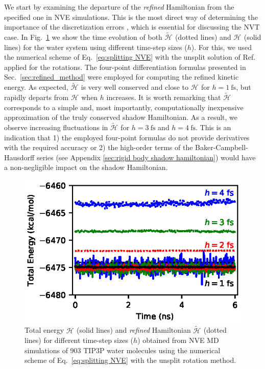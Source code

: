 \documentclass[
journal=jctcce,
layout=twocolumn
]{achemso}
\newcommand{\Ham}[1]{{\mathcal H}_\text{#1}}    %
\newcommand{\timestep}{h}
\newcommand{\refined}[1]{\widetilde{#1}}
\begin{document}
We start by examining the departure of the \textit{refined} Hamiltonian from the specified one in NVE simulations.
This is the most direct way of determining the importance of the discretization errors \cite{Engle_2005}, which is essential for discussing the NVT case.
In Fig.~\ref{fig:nve} we show the time evolution of both $\refined{\Ham{}}$ (dotted lines) and $\Ham{}$ (solid lines) for the water system using different time-step sizes ($\timestep$).
For this, we used the numerical scheme of Eq.~\eqref{eq:splitting NVE} with the unsplit solution of Ref.~ applied for the rotations.
The four-point differentiation formulas presented in Sec.~\ref{sec:refined_method} were employed for computing the refined kinetic energy.
As expected, $\refined{\Ham{}}$ is very well conserved and close to $\Ham{}$ for $\timestep = 1~\text{fs}$, but rapidly departs from $\Ham{}$ when $\timestep$ increases.
It is worth remarking that $\refined{\Ham{}}$ corresponds to a simple and, most importantly, computationally inexpensive approximation of the truly conserved shadow Hamiltonian.
As a result, we observe increasing fluctuations in $\refined{\Ham{}}$ for $\timestep = 3~\text{fs}$ and $\timestep = 4~\text{fs}$.
This is an indication that
1) the employed four-point formulas do not provide derivatives with the required accuracy or
2) the high-order terms of the Baker-Campbell-Hausdorff series (see Appendix \ref{sec:rigid body shadow hamiltonian}) would have a non-negligible impact on the shadow Hamiltonian.

\begin{figure}
	\includegraphics{Figures/NVE.eps}
	\caption{Total energy $\Ham{}$ (solid lines) and \textit{refined} Hamiltonian $\refined{\Ham{}}$ (dotted lines) for different time-step sizes ($\timestep$) obtained from NVE MD simulations of 903 TIP3P\cite{Jorgensen_1983} water molecules using the numerical scheme of Eq.~\ref{eq:splitting NVE} with the unsplit rotation method.}
	\label{fig:nve}
\end{figure}
\end{document}
